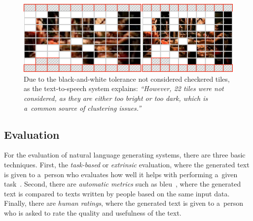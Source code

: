 \begin{figure}[!ht]
  \centering
  \includegraphics[width=0.75\linewidth]{./tile-highlight.png}
  \caption[Due to the black-and-white tolerance not considered checkered tiles]{Due to the black-and-white tolerance not considered checkered tiles, as the text-to-speech system explains: \textit{``However, 22 tiles were not considered, as they are either too bright or too dark, which is a~common source of clustering issues.''}}
  \label{fig:tile-highlight}
\end{figure}

\subsection{Evaluation}
\label{sec:evaluation}

For the evaluation of natural language generating systems,
there are three basic techniques.
First, the \emph{task-based} or \emph{extrinsic} evaluation,
where the generated text is given to a~person who evaluates
how well it helps with performing a~given task~\cite{portet2009nlg}.
Second, there are \emph{automatic metrics}
such as {\sc bleu}~\cite{papineni2002bleu}, where the generated text
is compared to texts written by people based on the same input data.
Finally, there are \emph{human ratings}, where the generated text
is given to a~person who is asked to rate the quality and usefulness of the text.


